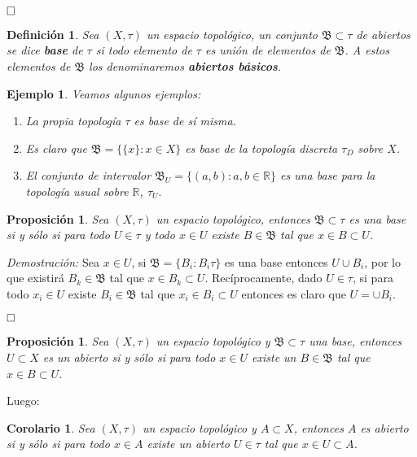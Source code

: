 \documentclass[12pt]{article}
\newtheorem{proposition}[theorem]{Proposición}
\newtheorem{definition}[theorem]{Definición}
\newtheorem{example}{Ejemplo}[theorem]
\newtheorem{corolario}{Corolario}[theorem]
\begin{document}
$\hfill \square$

\begin{definition}Sea $(X, \tau)$ un espacio topológico, un conjunto $\mathfrak{B} \subset \tau$ de abiertos se dice \textbf{base} de $\tau$ si todo elemento de $\tau$ es unión de elementos de $\mathfrak{B}$. A estos elementos de $\mathfrak{B}$ los denominaremos \textbf{abiertos básicos}.
\end{definition}

\begin{example}Veamos algunos ejemplos:
\begin{enumerate}
\item La propia topología $\tau$ es base de sí misma.
\item Es claro que $\mathfrak{B} = \lbrace \lbrace x \rbrace : x \in X \rbrace$ es base de la topología discreta $\tau_D$ sobre $	X$.
\item El conjunto de intervalor $\mathfrak{B}_U = \lbrace (a,b):a,b \in \mathbb{R} \rbrace$ es una base para la topología usual sobre $\mathbb{R}$, $\tau_U.$
\end{enumerate}
\end{example}

\begin{proposition}Sea $(X, \tau)$ un espacio topológico, entonces $\mathfrak{B} \subset \tau$ es una base si y sólo si para todo $U \in \tau$ y todo $x \in U$ existe $B \in \mathfrak{B}$ tal que $x \in B \subset U$.
\end{proposition}
\emph{Demostración: }Sea $x \in U$, si $\mathfrak{B} = \lbrace B_i : B_i \tau \rbrace $ es una base entonces $U \cup B_i$, por lo que existirá $B_k \in \mathfrak{B}$ tal que $x \in B_k \subset U$. Recíprocamente, dado $U \in \tau$, si para todo $x_i \in U$ existe $B_i \in \mathfrak{B}$ tal que $x_i \in B_i \subset U$ entonces es claro que $U = \cup B_i$.

$\hfill \square$

\begin{proposition}Sea $(X,\tau)$ un espacio topológico y $\mathfrak{B} \subset \tau$ una base, entonces $U \subset X$ es un abierto si y sólo si para todo $x \in U$ existe un $B \in \mathfrak{B}$ tal que $x \in B \subset U$.
\end{proposition}

Luego:

\begin{corolario}Sea $(X, \tau)$ un espacio topológico y $A \subset X$, entonces $A$ es abierto si y sólo si para todo $x \in A$ existe un abierto $U \in \tau$ tal que $x \in U \subset A$.
\end{corolario}
\end{document}
